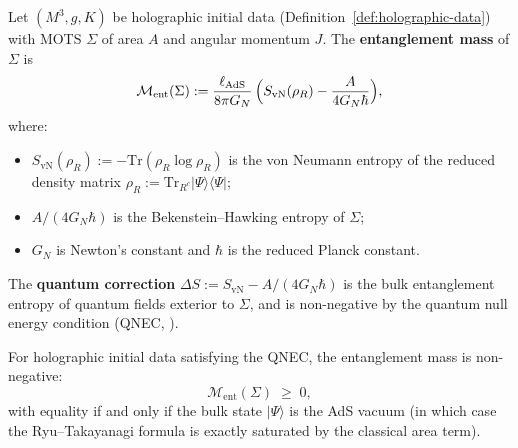 \begin{definition}\label{def:entanglement-mass}
Let $(M^3, g, K)$ be holographic initial data (Definition~\ref{def:holographic-data}) with MOTS $\Sigma$ of area $A$ and angular momentum $J$. The \textbf{entanglement mass} of $\Sigma$ is
\begin{equation}\label{eq:entanglement-mass-def}
\mathcal{M}_{\mathrm{ent}}(\Sigma) := \dfrac{\ell_{\mathrm{AdS}}}{8\pi G_N}\,\Bigl(S_{\mathrm{vN}}(\rho_R) - \dfrac{A}{4G_N\hbar}\Bigr),
\end{equation}
where:
\begin{itemize}
\item $S_{\mathrm{vN}}(\rho_R) := -\mathrm{Tr}(\rho_R \log \rho_R)$ is the von Neumann entropy of the reduced density matrix $\rho_R := \mathrm{Tr}_{R^c}|\Psi\rangle\langle\Psi|$;
\item $A/(4G_N\hbar)$ is the Bekenstein--Hawking entropy of $\Sigma$;
\item $G_N$ is Newton's constant and $\hbar$ is the reduced Planck constant.
\end{itemize}
The \textbf{quantum correction} $\Delta S := S_{\mathrm{vN}} - A/(4G_N\hbar)$ is the bulk entanglement entropy of quantum fields exterior to $\Sigma$, and is non-negative by the quantum null energy condition (QNEC, \cite{bousso2015, koymangenk2019}).
\end{definition}

\begin{theorem}\label{thm:entanglement-mass-positive}
For holographic initial data satisfying the QNEC, the entanglement mass is non-negative:
\begin{equation}\label{eq:entanglement-mass-positive}
\mathcal{M}_{\mathrm{ent}}(\Sigma) \;\geq\; 0,
\end{equation}
with equality if and only if the bulk state $|\Psi\rangle$ is the AdS vacuum (in which case the Ryu--Takayanagi formula is exactly saturated by the classical area term).
\end{theorem}

